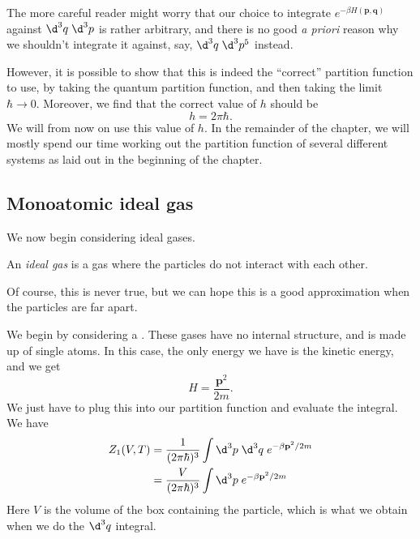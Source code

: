 \documentclass[a4paper]{article}
\begin{document}
The more careful reader might worry that our choice to integrate $e^{-\beta H(\mathbf{p}, \mathbf{q})}$ against $\d^3 q\; \d^3 p$ is rather arbitrary, and there is no good \emph{a priori} reason why we shouldn't integrate it against, say, $\d^3 q\; \d^3 p^5$ instead.

However, it is possible to show that this is indeed the ``correct'' partition function to use, by taking the quantum partition function, and then taking the limit $\hbar \to 0$. Moreover, we find that the correct value of $h$ should be
\[
  h = 2\pi \hbar.
\]
We will from now on use this value of $h$. In the remainder of the chapter, we will mostly spend our time working out the partition function of several different systems as laid out in the beginning of the chapter.

\subsection{Monoatomic ideal gas}
We now begin considering ideal gases.
\begin{defi}
  An \emph{ideal gas} is a gas where the particles do not interact with each other.
\end{defi}
Of course, this is never true, but we can hope this is a good approximation when the particles are far apart.

We begin by considering a . These gases have no internal structure, and is made up of single atoms. In this case, the only energy we have is the kinetic energy, and we get
\[
  H = \frac{\mathbf{p}^2}{2m}.
\]
We just have to plug this into our partition function and evaluate the integral. We have
\begin{align*}
  Z_1(V, T) &= \frac{1}{(2\pi \hbar)^3} \int \d^3 p\; \d^3 q\; e^{-\beta \mathbf{p}^2 /2m}\\
  &= \frac{V}{(2\pi \hbar)^3} \int \d^3 p\; e^{-\beta \mathbf{p}^2/2m}
\end{align*}
Here $V$ is the volume of the box containing the particle, which is what we obtain when we do the $\d^3 q$ integral.
\end{document}

